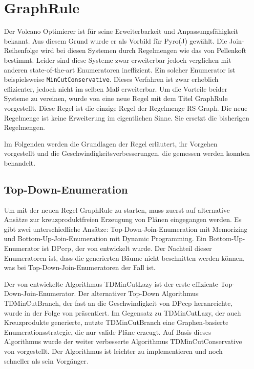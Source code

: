 \section{GraphRule}


Der Volcano Optimierer ist für seine Erweiterbarkeit und Anpassungsfähigkeit bekannt. Aus diesem Grund wurde er als Vorbild für Pyro(J) gewählt. Die Join-Reihenfolge wird bei diesen Systemen durch Regelmengen wie das von Pellenkoft bestimmt. Leider sind diese Systeme zwar erweiterbar jedoch verglichen mit anderen state-of-the-art Enumeratoren ineffizient. Ein solcher Enumerator ist beispielsweise \texttt{MinCutConservative}. Dieses Verfahren ist zwar erheblich effizienter, jedoch nicht im selben Maß erweiterbar. Um die Vorteile beider Systeme zu vereinen, wurde von \cite{shanbhag2014optimizing} eine neue Regel mit dem Titel GraphRule vorgestellt. Diese Regel ist die einzige Regel der Regelmenge RS-Graph. Die neue Regelmenge ist keine Erweiterung im eigentlichen Sinne. Sie ersetzt die bisherigen Regelmengen.

Im Folgenden werden die Grundlagen der Regel erläutert, ihr Vorgehen vorgestellt und die Geschwindigkeitsverbesserungen, die gemessen werden konnten behandelt.

\subsection{Top-Down-Enumeration}

Um mit der neuen Regel GraphRule zu starten, muss zuerst auf alternative Ansätze zur kreuzproduktfreien Erzeugung von Plänen eingegangen werden. Es gibt zwei unterschiedliche Ansätze: Top-Down-Join-Enumeration mit Memorizing und Bottom-Up-Join-Enumeration mit Dynamic Programming. Ein Bottom-Up-Enumerator ist DPccp, der von \cite{moerkotte2006analysis} entwickelt wurde. Der Nachteil dieser Enumeratoren ist, dass die generierten Bäume nicht beschnitten werden können, was bei Top-Down-Join-Enumeratoren der Fall ist.

Der von \cite{dehaan2007optimal} entwickelte Algorithmus TDMinCutLazy ist der erste effiziente Top-Down-Join-Enumerator. Der alternativer Top-Down Algorithmus TDMinCutBranch, der fast an die Geschwindigkeit von DPccp heranreichte, wurde in der Folge von \cite{fender2011new} präsentiert. Im Gegensatz zu TDMinCutLazy, der auch Kreuzprodukte generierte, nutzte TDMinCutBranch eine Graphen-basierte Enumerationsstrategie, die nur valide Pläne erzeugt.  Auf Basis dieses Algorithmus wurde der weiter verbesserte Algorithmus TDMinCutConservative von \cite{fender2012effective} vorgestellt. Der Algorithmus ist leichter zu implementieren und noch schneller als sein Vorgänger. 



